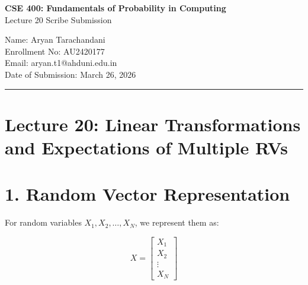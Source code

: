 ﻿\documentclass[12pt]{article}
\begin{document}
\onehalfspacing


\setlength{\parskip}{0.4em}
\setlength{\parindent}{0pt}
\setlength{\itemsep}{0.2em}






\begin{center}
\textbf{CSE 400: Fundamentals of Probability in Computing}\\
Lecture 20 Scribe Submission


\vspace{0.4cm}


Name: Aryan Tarachandani\\
Enrollment No: AU2420177\\
Email: aryan.t1@ahduni.edu.in\\
Date of Submission: March 26, 2026
\end{center}


\vspace{0.4cm}
\noindent\rule{\textwidth}{0.5pt}
\vspace{0.6cm}




\section*{Lecture 20: Linear Transformations and Expectations of Multiple RVs}


\vspace{0.3cm}




\section*{1. Random Vector Representation}


\vspace{0.2cm}


For random variables $X_1, X_2, \dots, X_N$, we represent them as:


\[
X =
\begin{bmatrix}
X_1 \\
X_2 \\
\vdots \\
X_N
\end{bmatrix}
\]
\end{document}
